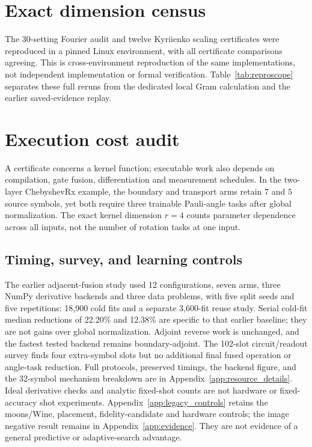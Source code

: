 \documentclass[a4paper,twocolumn,11pt,unpublished]{quantumarticle}
\begin{document}






\section{Exact dimension census}



The 30-setting Fourier audit and twelve Kyriienko scaling
certificates were reproduced in a pinned Linux environment, with all
certificate comparisons agreeing. This is cross-environment
reproduction of the same implementations, not independent
implementation or formal verification. Table~\ref{tab:reproscope}
separates these full reruns from the dedicated local Gram calculation
and the earlier saved-evidence replay.

\section{Execution cost audit}
\label{sec:cost}
A certificate concerns a kernel function; executable work also depends
on compilation, gate fusion, differentiation and measurement schedules.
In the two-layer ChebyshevRx example, the boundary and transport arms
retain $7$ and $5$ source symbols, yet both require three trainable
Pauli-angle tasks after global normalization. The exact kernel
dimension $r=4$ counts parameter dependence across all inputs, not the
number of rotation tasks at one input.



\subsection{Timing, survey, and learning controls}
The earlier adjacent-fusion study used 12 configurations, seven arms,
three NumPy derivative backends and three data problems, with five split
seeds and five repetitions: 18,900 cold fits and a separate 3,600-fit
reuse study. Serial cold-fit median reductions of 22.20\% and 12.38\%
are specific to that earlier baseline; they are not gains over global
normalization. Adjoint reverse work is unchanged, and the fastest
tested backend remains boundary-adjoint. The 102-slot circuit/readout
survey finds four extra-symbol slots but no additional final fused
operation or angle-task reduction. Full protocols, preserved timings,
the backend figure, and the 32-symbol mechanism breakdown are in
Appendix~\ref{app:resource_details}. Ideal derivative checks and analytic
fixed-shot counts are not hardware or fixed-accuracy shot experiments.
Appendix~\ref{app:legacy_controls} retains the moons/Wine, placement,
fidelity-candidate and hardware controls; the image negative result
remains in Appendix~\ref{app:evidence}. They are not evidence of a
general predictive or adaptive-search advantage.
\end{document}
